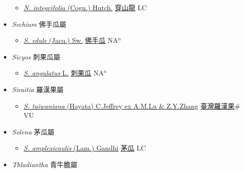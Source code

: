 \begin{itemize}
  \begin{itemize}
        \item[] \href{http://www.theplantlist.org/tpl1.1/search?q=Neoalsomitra+integrifolia}{\textit{N. integrifolia} (Cogn.) Hutch.}   \href{\detokenize{http://taibnet.sinica.edu.tw/chi/taibnet_species_list.php?T2=穿山龍&T2_new_value=true&fr=y}}{穿山龍} LC
  \end{itemize}
 \item[] \textit{Sechium} 佛手瓜屬
                    
  \begin{itemize}
        \item[] \href{http://www.theplantlist.org/tpl1.1/search?q=Sechium+edule}{\textit{S. edule} (Jacq.) Sw.}   \href{\detokenize{http://taibnet.sinica.edu.tw/chi/taibnet_species_list.php?T2=佛手瓜&T2_new_value=true&fr=y}}{佛手瓜} NA$^n$
  \end{itemize}
 \item[] \textit{Sicyos} 刺果瓜屬
                    
  \begin{itemize}
        \item[] \href{http://www.theplantlist.org/tpl1.1/search?q=Sicyos+angulatus}{\textit{S. angulatus} L.}   \href{\detokenize{http://taibnet.sinica.edu.tw/chi/taibnet_species_list.php?T2=刺果瓜&T2_new_value=true&fr=y}}{刺果瓜} NA$^n$
  \end{itemize}
 \item[] \textit{Siraitia} 羅漢果屬
                    
  \begin{itemize}
        \item[] \href{http://www.theplantlist.org/tpl1.1/search?q=Siraitia+taiwaniana}{\textit{S. taiwaniana} (Hayata) C.Jeffrey ex A.M.Lu \& Z.Y.Zhang}   \href{\detokenize{http://taibnet.sinica.edu.tw/chi/taibnet_species_list.php?T2=臺灣羅漢果&T2_new_value=true&fr=y}}{臺灣羅漢果}\# VU
  \end{itemize}
 \item[] \textit{Solena} 茅瓜屬
                    
  \begin{itemize}
        \item[] \href{http://www.theplantlist.org/tpl1.1/search?q=Solena+amplexicaulis}{\textit{S. amplexicaulis} (Lam.) Gandhi}   \href{\detokenize{http://taibnet.sinica.edu.tw/chi/taibnet_species_list.php?T2=茅瓜&T2_new_value=true&fr=y}}{茅瓜} LC
  \end{itemize}
 \item[] \textit{Thladiantha} 青牛膽屬
                    

\end{itemize}
